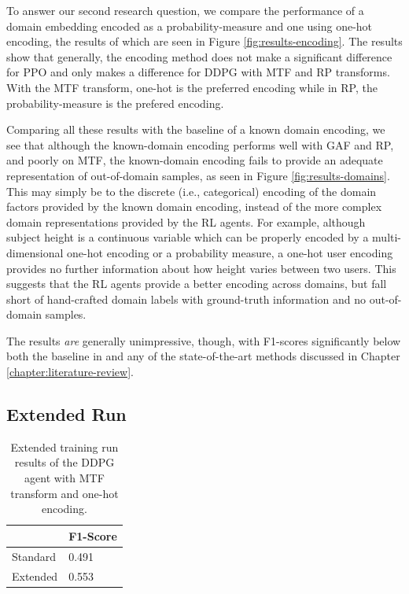 To answer our second research question, we compare the performance of a domain embedding encoded as a probability-measure and one using one-hot encoding, the results of which are seen in Figure \ref{fig:results-encoding}.
The results show that generally, the encoding method does not make a significant difference for PPO and only makes a difference for DDPG with MTF and RP transforms.
With the MTF transform, one-hot is the preferred encoding while in RP, the probability-measure is the prefered encoding.

Comparing all these results with the baseline of a known domain encoding, we see that although the known-domain encoding performs well with GAF and RP, and poorly on MTF, the known-domain encoding fails to provide an adequate representation of out-of-domain samples, as seen in Figure \ref{fig:results-domains}.
This may simply be to the discrete (i.e., categorical) encoding of the domain factors provided by the known domain encoding, instead of the more complex domain representations provided by the RL agents.
For example, although subject height is a continuous variable which can be properly encoded by a multi-dimensional one-hot encoding or a probability measure, a one-hot user encoding provides no further information about how height varies between two users.
This suggests that the RL agents provide a better encoding across domains, but fall short of hand-crafted domain labels with ground-truth information and no out-of-domain samples.

The results \textit{are} generally unimpressive, though, with F1-scores significantly below both the baseline in \cite{zheng2019zero} and any of the state-of-the-art methods discussed in Chapter \ref{chapter:literature-review}.

\subsection{Extended Run}\label{subsec:experiments-longer}

\begin{table}[]
	\centering
	\begin{tabular}{@{}ll@{}}
		\toprule
		& F1-Score \\ \midrule
		Standard & 0.491    \\
		Extended & 0.553   \\ \bottomrule
	\end{tabular}
	\caption{Extended training run results of the DDPG agent with MTF transform and one-hot encoding.}
\end{table}

